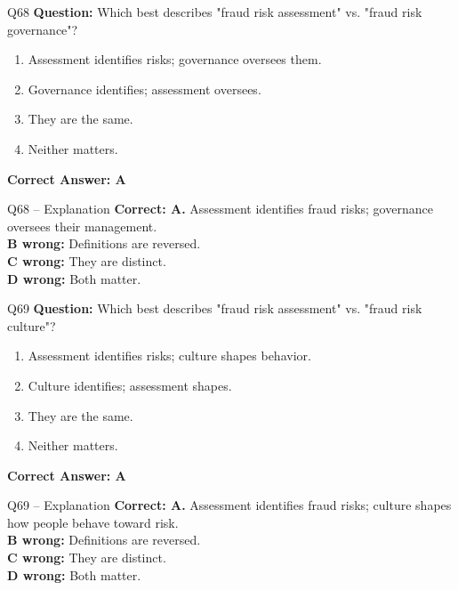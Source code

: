 \documentclass[aspectratio=169,10pt]{beamer}
\begin{document}
	\begin{frame}[t]{Q68}
		\small
		\textbf{Question:} Which best describes "fraud risk assessment" vs. "fraud risk governance"?
		\begin{enumerate}[label=\Alph*.,itemsep=1pt,topsep=2pt]
			\item Assessment identifies risks; governance oversees them.
			\item Governance identifies; assessment oversees.
			\item They are the same.
			\item Neither matters.
		\end{enumerate}
		\vspace{4pt}
		\textbf{Correct Answer: A}
	\end{frame}
	
	\begin{frame}[t]{Q68 -- Explanation}
		\small
		\textbf{Correct: A.} Assessment identifies fraud risks; governance oversees their management. \\[4pt]
		\textbf{B wrong:} Definitions are reversed. \\[2pt]
		\textbf{C wrong:} They are distinct. \\[2pt]
		\textbf{D wrong:} Both matter.
	\end{frame}
	
	\begin{frame}[t]{Q69}
		\small
		\textbf{Question:} Which best describes "fraud risk assessment" vs. "fraud risk culture"?
		\begin{enumerate}[label=\Alph*.,itemsep=1pt,topsep=2pt]
			\item Assessment identifies risks; culture shapes behavior.
			\item Culture identifies; assessment shapes.
			\item They are the same.
			\item Neither matters.
		\end{enumerate}
		\vspace{4pt}
		\textbf{Correct Answer: A}
	\end{frame}
	
	\begin{frame}[t]{Q69 -- Explanation}
		\small
		\textbf{Correct: A.} Assessment identifies fraud risks; culture shapes how people behave toward risk. \\[4pt]
		\textbf{B wrong:} Definitions are reversed. \\[2pt]
		\textbf{C wrong:} They are distinct. \\[2pt]
		\textbf{D wrong:} Both matter.
	\end{frame}
	
\end{document}
